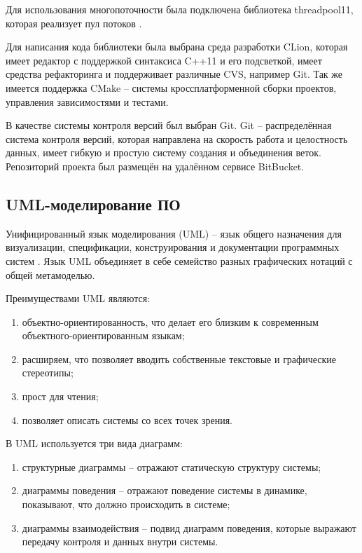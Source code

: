 Для использования многопоточности была подключена библиотека threadpool11, которая реализует пул потоков \cite{THREAD_POOL}.

Для написания кода библиотеки была выбрана среда разработки CLion, которая имеет редактор с поддержкой синтаксиса C++11 и его подсветкой, имеет средства рефакторинга и поддерживает различные CVS, например Git. Так же имеется поддержка CMake -- системы кроссплатформенной сборки проектов, управления зависимостями и тестами.

В качестве системы контроля версий был выбран Git. Git -- распределённая система контроля версий, которая направлена на скорость работа и целостность данных, имеет гибкую и простую систему создания и объединения веток. Репозиторий проекта был размещён на удалённом сервисе BitBucket.
%

\subsection{UML-моделирование ПО}

Унифицированный язык моделирования (UML) -- язык общего назначения для визуализации, спецификации, конструирования и документации программных систем \cite{UML_USER_GUIDE_2ND}. Язык UML объединяет в себе семейство разных графических нотаций с общей метамоделью. 

Преимуществами UML являются:

\begin{enumerate}
    \item объектно-ориентированность, что делает его близким к современным объектного-ориентированным языкам;
    \item расширяем, что позволяет вводить собственные текстовые и графические стереотипы;
    \item прост для чтения;
    \item позволяет описать системы со всех точек зрения.
\end{enumerate}

В UML используется три вида диаграмм:

\begin{enumerate}
    \item структурные диаграммы -- отражают статическую структуру системы;
    \item диаграммы поведения -- отражают поведение системы в динамике, показывают, что должно происходить в системе;
    \item диаграммы взаимодействия -- подвид диаграмм поведения, которые выражают передачу контроля и данных внутри системы.
\end{enumerate} 

